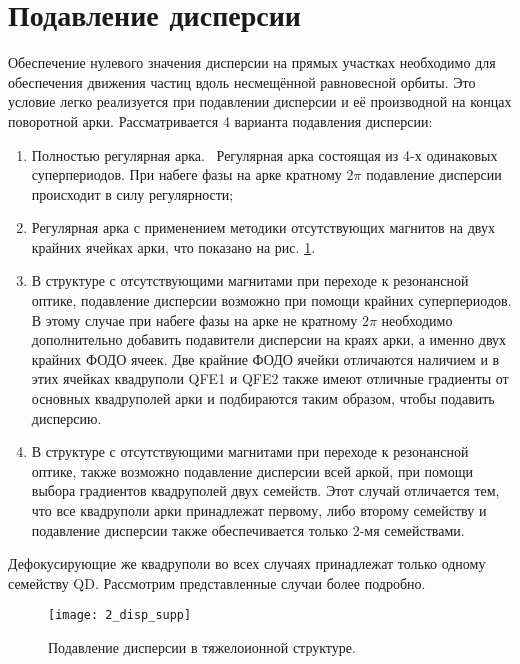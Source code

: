 \section{Подавление дисперсии}\label{sec:transition_variation/disp_supperssion}

\par Обеспечение нулевого значения дисперсии на прямых участках необходимо для обеспечения движения частиц вдоль несмещённой равновесной орбиты. Это условие легко реализуется при подавлении дисперсии и её производной на концах поворотной арки. Рассматривается 4 варианта подавления дисперсии:

\begin{enumerate} 
\item	Полностью регулярная арка. \ Регулярная арка состоящая из 4-х одинаковых суперпериодов. При набеге фазы на арке кратному $2\pi$ подавление дисперсии происходит в силу регулярности;
\item Регулярная арка с применением методики отсутствующих магнитов на двух крайних ячейках арки, что показано на рис. \ref{fig:2_disp_supp}.
\item В структуре с отсутствующими магнитами при переходе к резонансной оптике, подавление дисперсии возможно при помощи крайних суперпериодов. В этому случае при набеге фазы на арке не кратному $2\pi$ необходимо дополнительно добавить подавители дисперсии на краях арки, а именно двух крайних ФОДО ячеек. Две крайние ФОДО ячейки отличаются наличием и в этих ячейках квадруполи QFE1 и QFE2 также имеют отличные градиенты от основных квадруполей арки и подбираются таким образом, чтобы подавить дисперсию.
\item В структуре с отсутствующими магнитами при переходе к резонансной оптике, также возможно подавление дисперсии всей аркой, при помощи выбора градиентов квадруполей двух семейств. Этот случай отличается тем, что все квадруполи арки принадлежат первому, либо второму семейству и подавление дисперсии также обеспечивается только 2-мя семействами.
\end{enumerate} 

\noindent Дефокусирующие же квадруполи во всех случаях принадлежат только одному семейству QD. Рассмотрим представленные случаи  более подробно.

\begin{figure} [h!]
	\center
	\texttt{[image: 2\_disp\_supp]}
	\caption{Подавление дисперсии в тяжелоионной структуре.}
	\label{fig:2_disp_supp}
\end{figure}

